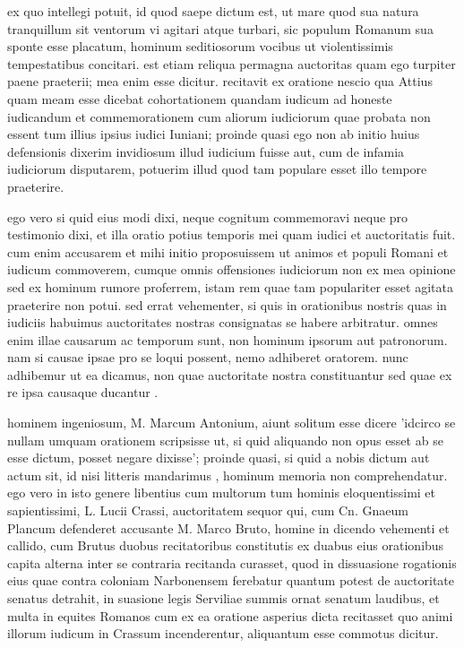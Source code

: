  ex quo intellegi potuit, id quod saepe dictum est, ut mare quod sua natura tranquillum sit ventorum vi agitari atque turbari, sic populum Romanum sua sponte esse placatum, hominum seditiosorum vocibus ut violentissimis tempestatibus concitari. est etiam reliqua permagna auctoritas quam ego turpiter paene praeterii; mea enim esse dicitur. recitavit ex oratione nescio qua Attius quam meam esse dicebat cohortationem quandam iudicum ad honeste iudicandum et commemorationem cum aliorum iudiciorum quae probata non essent tum illius ipsius iudici Iuniani; proinde quasi ego non ab initio huius defensionis dixerim invidiosum illud iudicium fuisse aut, cum de infamia iudiciorum disputarem, potuerim illud quod tam populare esset illo tempore praeterire.

 ego vero si quid eius modi dixi, neque cognitum commemoravi neque pro testimonio dixi, et illa oratio potius temporis mei quam iudici et auctoritatis fuit. cum enim accusarem et mihi initio proposuissem ut animos et populi Romani et iudicum commoverem, cumque omnis offensiones iudiciorum non ex mea opinione sed ex hominum rumore proferrem, istam rem quae tam populariter esset agitata praeterire non potui. sed errat vehementer, si quis in orationibus nostris quas in iudiciis habuimus auctoritates nostras consignatas se habere arbitratur. omnes enim illae causarum ac temporum sunt, non hominum ipsorum aut patronorum. nam si causae ipsae pro se loqui possent, nemo adhiberet oratorem. nunc adhibemur ut ea dicamus, non quae auctoritate nostra constituantur sed quae ex re ipsa causaque ducantur .

 hominem ingeniosum, M. Marcum Antonium, aiunt solitum esse dicere 'idcirco se nullam umquam orationem scripsisse ut, si quid aliquando non opus esset ab se esse dictum, posset negare dixisse'; proinde quasi, si quid a nobis dictum aut actum sit, id nisi litteris mandarimus , hominum memoria non comprehendatur. ego vero in isto genere libentius cum multorum tum hominis eloquentissimi et sapientissimi, L. Lucii Crassi, auctoritatem sequor qui, cum Cn. Gnaeum Plancum defenderet accusante M. Marco Bruto, homine in dicendo vehementi et callido, cum Brutus duobus recitatoribus constitutis ex duabus eius orationibus capita alterna inter se contraria recitanda curasset, quod in dissuasione rogationis eius quae contra coloniam Narbonensem ferebatur quantum potest de auctoritate senatus detrahit, in suasione legis Serviliae summis ornat senatum laudibus, et multa in equites Romanos cum ex ea oratione asperius dicta recitasset quo animi illorum iudicum in Crassum incenderentur, aliquantum esse commotus dicitur.


